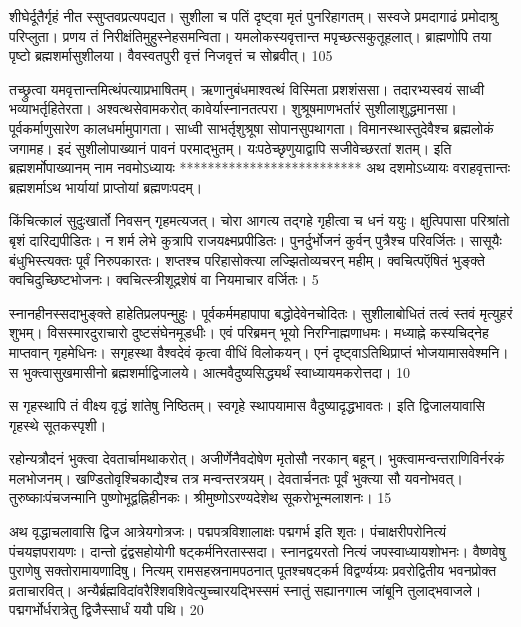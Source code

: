 शीघेर्दूतैर्गृहं नीत स्सुप्तवप्रत्यपद्यत।
सुशीला च पतिं दृष्ट्वा मृतं पुनरिहागतम्।
सस्वजे प्रमदागाढं प्रमोदाश्रु परिप्लुता।
प्रणय तं निरीक्षंतिमुहुस्नेहसमन्विता।
यमलोकस्यवृत्तान्त मपृच्छत्सकुतूहलात्।
ब्राह्मणोपि तया पृष्टो ब्रह्मशर्मासुशीलया।
वैवस्वतपुरी वृत्तं निजवृत्तं च सोब्रवीत्।
105

तच्छ्रुत्वा यमवृत्तान्तमित्थंपत्याप्रभाषितम्।
ऋणानुबंधमाश्वत्थं विस्मिता प्रशशंससा।
तदारभ्यस्वयं साध्वी भव्याभर्तृहितेरता।
अश्वत्थसेवामकरोत् कावेर्यास्नानतत्परा।
शुश्रूषमाणभर्तारं सुशीलाशुद्धमानसा।
पूर्वकर्माणुसारेण कालधर्मामुपागता।
साध्वी साभर्तृशुश्रूषा सोपानसुपथागता।
विमानस्थास्तुदेवैश्च ब्रह्मलोकं जगामह।
इदं सुशीलोपाख्यानं पावनं परमाद्भुतम्।
यःपठेच्छृणुयाद्वापि सजीवेच्छरतां शतम्।
इति ब्रह्मशर्मोपाख्यानम् नाम नवमोऽध्यायः
**************************
अथ दशमोऽध्यायः
वराहवृत्तान्तः ब्रह्मशर्माऽथ भार्यायां प्राप्तोयां ब्रह्मणःपदम्।

किंचित्कालं सुदुःखार्तो निवसन् गृहमत्यजत्।
चोरा आगत्य तद्गहे गृहीत्वा च धनं ययुः।
क्षुत्पिपासा परिश्रांतो बृशं दारिद्यपीडितः।
न शर्म लेभे कुत्रापि राजयक्ष्मप्रपीडितः।
पुनर्दुर्भोजनं कुर्वन् पुत्रैश्च परिवर्जितः।
सासूयैः बंधुभिस्त्यक्तः पूर्वं निरुपकारतः।
शप्तश्च परिहासोक्त्या लज्झितोव्यचरन् महीम्।
क्वचित्पऍषितं भुङ्क्ते क्वचिदुच्छिष्टभोजनः।
क्वचित्स्त्रीशूद्रशेषं वा नियमाचार वर्जितः।
5

स्नानहीनस्सदाभुङ्क्ते हाहेतिप्रलपन्मुहुः।
पूर्वकर्ममहापापा बद्धोदेवेनचोदितः।
सुशीलाबोधितं तत्वं स्तवं मृत्युहरं शुभम्।
विसस्मारदुराचारो दुष्टसंघेनमूडधीः।
एवं परिब्रमन् भूयो निरग्निाह्मणाधमः।
मध्याह्ने कस्यचिद्नेह माप्तवान् गृहमेधिनः।
सगृहस्था वैश्वदेवं कृत्वा वीधिं विलोकयन्।
एनं दृष्ट्वाऽतिथिप्राप्तं भोजयामासवेश्मनि।
स भुक्त्वासुखमासीनो ब्रह्मशर्माद्विजालये।
आत्मवैदुष्यसिद्ध्यर्थं स्वाध्यायमकरोत्तदा।
10

स गृहस्थापि तं वीक्ष्य वृद्धं शांतेषु निष्ठितम्।
स्वगृहे स्थापयामास वैदुष्यादृद्धभावतः।
इति द्विजालयावासि गृहस्थे सूतकस्पृशी।

रहोन्यत्रौदनं भुक्त्वा देवतार्चामथाकरोत्।
अजीर्णेनैवदोषेण मृतोसौ नरकान् बहून्।
भुक्त्वामन्वन्तराणिविर्नरकं मलभोजनम्।
खण्डितोवृश्चिकाद्यैश्च तत्र मन्वन्तरत्रयम्।
देवतार्चनतः पूर्वं भुक्त्या सौ यवनोभवत्।
तुरुष्काःपंचजन्मानि पुष्णोभूद्वह्निहीनकः।
श्रीमुष्णोऽरण्यदेशेथ सूकरोभून्मलाशनः।
15

अथ वृद्धाचलावासि द्विज आत्रेयगोत्रजः।
पद्मपत्रविशालाक्षः पद्मगर्भ इति शृतः।
पंचाक्षरीपरोनित्यं पंचयज्ञपरायणः।
दान्तो द्वंद्वसहोयोगी षट्कर्मनिरतास्सदा।
स्नानद्वयरतो नित्यं जपस्वाध्यायशोभनः।
वैष्णवेषु पुराणेषु सक्तोरामायणादिषु।
नित्यम् रामसहस्रनामपठनात् पूतश्चषट्कर्म विद्वर्ण्यग्र्यः प्रवरोद्वितीय भवनप्रोक्त व्रताचारवित्।
अन्यैर्ब्रह्मविदांवरैश्शिवशिवेत्युच्चारयद्भिस्समं स्नातुं सह्यानगात्म जांबूनि तुलाद्भवाजले।
पद्मगर्भोर्धरात्रेतु द्विजैस्सार्धं ययौ पथि।
20

